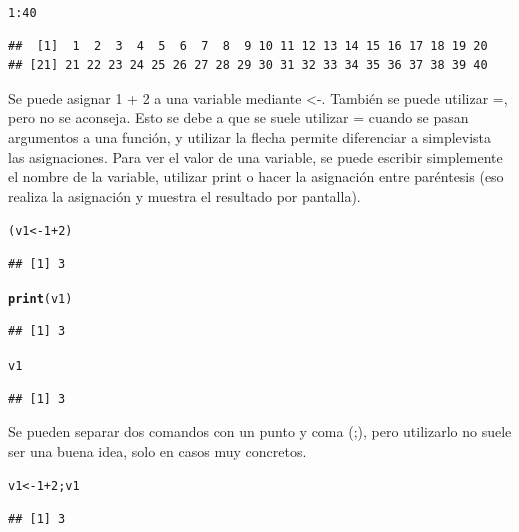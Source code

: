 \documentclass{config/apuntes}\usepackage[]{graphicx}\usepackage[]{xcolor}
\makeatletter
\newcommand{\hlnum}[1]{\textcolor[rgb]{0.686,0.059,0.569}{#1}}%
\newcommand{\hlopt}[1]{\textcolor[rgb]{0,0,0}{#1}}%
\newcommand{\hldef}[1]{\textcolor[rgb]{0.345,0.345,0.345}{#1}}%
\newcommand{\hlkwb}[1]{\textcolor[rgb]{0.69,0.353,0.396}{#1}}%
\newcommand{\hlkwd}[1]{\textcolor[rgb]{0.737,0.353,0.396}{\textbf{#1}}}%
\newenvironment{kframe}{%
 \def\at@end@of@kframe{}%
 \ifinner\ifhmode%
  \def\at@end@of@kframe{\end{minipage}}%
  \begin{minipage}{\columnwidth}%
 \fi\fi%
 \def\FrameCommand##1{\hskip\@totalleftmargin \hskip-\fboxsep
 \colorbox{shadecolor}{##1}\hskip-\fboxsep
     \hskip-\linewidth \hskip-\@totalleftmargin \hskip\columnwidth}%
 \MakeFramed {\advance\hsize-\width
   \@totalleftmargin\z@ \linewidth\hsize
   \@setminipage}}%
 {\par\unskip\endMakeFramed%
 \at@end@of@kframe}
\newenvironment{knitrout}{}{} %
\makeatother
\begin{document}
\begin{knitrout}
\color{fgcolor}\begin{kframe}
\begin{alltt}
\hlnum{1}\hlopt{:}\hlnum{40}
\end{alltt}
\begin{verbatim}
##  [1]  1  2  3  4  5  6  7  8  9 10 11 12 13 14 15 16 17 18 19 20
## [21] 21 22 23 24 25 26 27 28 29 30 31 32 33 34 35 36 37 38 39 40
\end{verbatim}
\end{kframe}
\end{knitrout}

Se puede asignar 1 + 2 a una variable mediante <-. También se puede utilizar =, pero no se aconseja. Esto se debe a que se suele utilizar = cuando se pasan argumentos a una función, y utilizar la flecha permite diferenciar a simplevista las asignaciones. Para ver el valor de una variable, se puede escribir simplemente el nombre de la variable, utilizar print o hacer la asignación entre paréntesis (eso realiza la asignación y muestra el resultado por pantalla).

\begin{knitrout}
\color{fgcolor}\begin{kframe}
\begin{alltt}
\hldef{(v1} \hlkwb{<-} \hlnum{1} \hlopt{+} \hlnum{2}\hldef{)}
\end{alltt}
\begin{verbatim}
## [1] 3
\end{verbatim}
\begin{alltt}
\hlkwd{print}\hldef{(v1)}
\end{alltt}
\begin{verbatim}
## [1] 3
\end{verbatim}
\begin{alltt}
\hldef{v1}
\end{alltt}
\begin{verbatim}
## [1] 3
\end{verbatim}
\end{kframe}
\end{knitrout}

Se pueden separar dos comandos con un punto y coma (;), pero utilizarlo no suele ser una buena idea, solo en casos muy concretos. 

\begin{knitrout}
\color{fgcolor}\begin{kframe}
\begin{alltt}
\hldef{v1} \hlkwb{<-} \hlnum{1} \hlopt{+} \hlnum{2}\hldef{; v1}
\end{alltt}
\begin{verbatim}
## [1] 3
\end{verbatim}
\end{kframe}
\end{knitrout}
\end{document}
